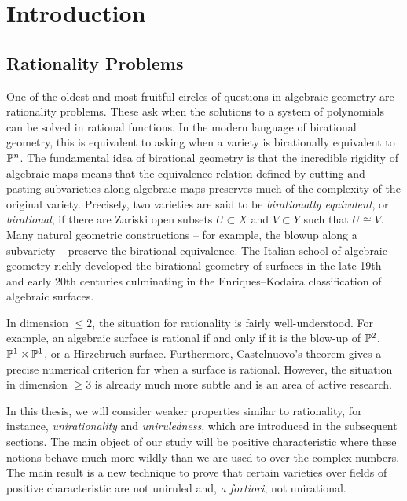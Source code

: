 \documentclass[main.tex]{subfiles}
\begin{document}
\chapter{Introduction} \label{chapter:intro}

\section{Rationality Problems}

One of the oldest and most fruitful circles of questions in algebraic geometry are rationality problems. These ask when the solutions to a system of polynomials can be solved in rational functions. In the modern language of birational geometry, this is equivalent to asking when a variety is birationally equivalent to $\P^n$. The fundamental idea of birational geometry is that the incredible rigidity of algebraic maps means that the equivalence relation defined by cutting and pasting subvarieties along algebraic maps preserves much of the complexity of the original variety. Precisely, two varieties are said to be \textit{birationally equivalent}, or \textit{birational}, if there are Zariski open subsets $U \subset X$ and $V \subset Y$ such that $U \cong V$. Many natural geometric constructions -- for example, the blowup along a subvariety -- preserve the birational equivalence. The Italian school of algebraic geometry richly developed the birational geometry of surfaces in the late 19th and early 20th centuries culminating in the Enriques--Kodaira classification of algebraic surfaces.
\par 
In dimension $\leq 2$, the situation for rationality is fairly well-understood. For example, an algebraic surface is rational if and only if it is the blow-up of $\P^2$, $\P^1 \times \P^1$, or a Hirzebruch surface. Furthermore, Castelnuovo's theorem gives a precise numerical criterion for when a surface is rational. However, the situation in dimension $\geq 3$ is already much more subtle and is an area of active research. 
\par 
In this thesis, we will consider weaker properties similar to rationality, for instance, \textit{unirationality} and \textit{uniruledness}, which are introduced in the subsequent sections. The main object of our study will be positive characteristic where these notions behave much more wildly than we are used to over the complex numbers. The main result is a new technique to prove that certain varieties over fields of positive characteristic are not uniruled and, \textit{a fortiori}, not unirational.
\end{document}
